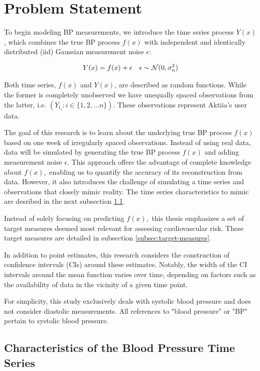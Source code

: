 \section{Problem Statement}

To begin modeling BP measurements, we introduce the time series process $Y(x)$,
which combines the true BP process $f(x)$ with independent and identically
distributed (iid) Gaussian measurement noise $\epsilon$:

\begin{align*}
    Y(x) = f(x) + \epsilon && \epsilon \sim \operatorname{\mathcal{N}}(0, \sigma_n^{2})
\end{align*}

Both time series, $f(x)$ and $Y(x)$, are described as random functions.
While the former is completely unobserved we have
unequally spaced observations from the latter, i.e. $(Y_{t_i}: i \in \{1, 2, \dots n\})$.
These observations represent Aktiia's user data.

The goal of this research is to learn about the underlying true BP process
$f(x)$ based on one week of irregularly spaced observations.
Instead of using real data, data will be simulated by generating the true BP
process $f(x)$ and adding measurement noise $\epsilon$.
This approach offers the advantage of
complete knowledge about $f(x),$ enabling us to quantify the accuracy of its
reconstruction from data. However, it also introduces the challenge of simulating
a time series and observations that closely mimic reality.
The time series characteristics to mimic are desribed in the next subsection
\ref{sec:characteristics-of-the-blood-pressure-time-series}.

Instead of solely focusing on predicting $f(x),$ this thesis emphasizes a set of
target measures deemed most relevant for assessing cardiovascular risk. These
target measures are detailed in subsection \ref{subsec:target-measures}.

In addition to point estimates, this research considers the construction of
confidence intervals (CIs) around these estimates. Notably, the width of the CI
intervals around the mean function varies over time, depending on factors such as
the availability of data in the vicinity of a given time point.

For simplicity, this study exclusively deals with systolic blood pressure and does
not consider diastolic measurements. All references to "blood pressure" or "BP"
pertain to systolic blood pressure.


\subsection{Characteristics of the Blood Pressure Time Series}\label{sec:characteristics-of-the-blood-pressure-time-series}


